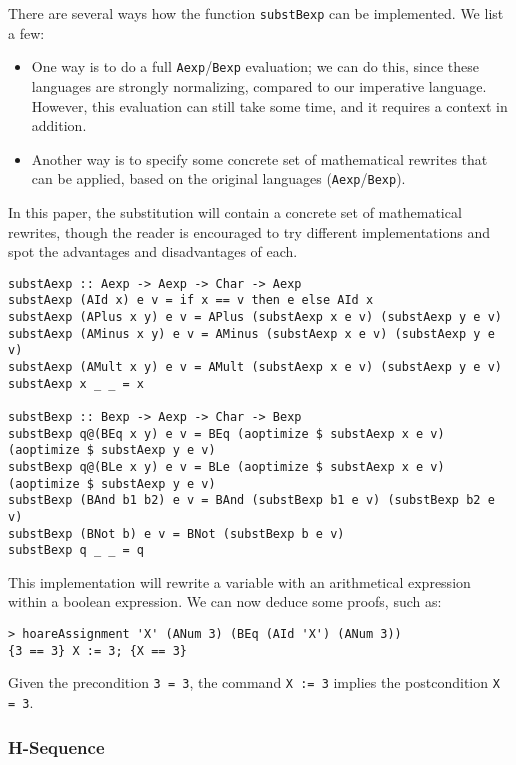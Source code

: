 \documentclass{article}
\begin{document}
There are several ways how the function \texttt{substBexp} can be implemented. We list a few:

\begin{itemize}
\item One way is to do a full \texttt{Aexp}/\texttt{Bexp} evaluation; we can do this, since these languages are strongly normalizing, compared to our imperative language. However, this evaluation can still take some time, and it requires a context in addition.
\item Another way is to specify some concrete set of mathematical rewrites that can be applied, based on the original languages (\texttt{Aexp}/\texttt{Bexp}).
\end{itemize}

In this paper, the substitution will contain a concrete set of mathematical rewrites, though the reader is encouraged to try different implementations and spot the advantages and disadvantages of each.

\begin{lstlisting}
substAexp :: Aexp -> Aexp -> Char -> Aexp
substAexp (AId x) e v = if x == v then e else AId x
substAexp (APlus x y) e v = APlus (substAexp x e v) (substAexp y e v)
substAexp (AMinus x y) e v = AMinus (substAexp x e v) (substAexp y e v)
substAexp (AMult x y) e v = AMult (substAexp x e v) (substAexp y e v)
substAexp x _ _ = x

substBexp :: Bexp -> Aexp -> Char -> Bexp
substBexp q@(BEq x y) e v = BEq (aoptimize $ substAexp x e v) (aoptimize $ substAexp y e v)
substBexp q@(BLe x y) e v = BLe (aoptimize $ substAexp x e v) (aoptimize $ substAexp y e v)
substBexp (BAnd b1 b2) e v = BAnd (substBexp b1 e v) (substBexp b2 e v)
substBexp (BNot b) e v = BNot (substBexp b e v)
substBexp q _ _ = q
\end{lstlisting}

This implementation will rewrite a variable with an arithmetical expression within a boolean expression. We can now deduce some proofs, such as:

\begin{lstlisting}
> hoareAssignment 'X' (ANum 3) (BEq (AId 'X') (ANum 3))
{3 == 3} X := 3; {X == 3}
\end{lstlisting}

Given the precondition \texttt{3 = 3}, the command \texttt{X := 3} implies the postcondition \texttt{X = 3}.

\subsubsection{H-Sequence}
\end{document}
